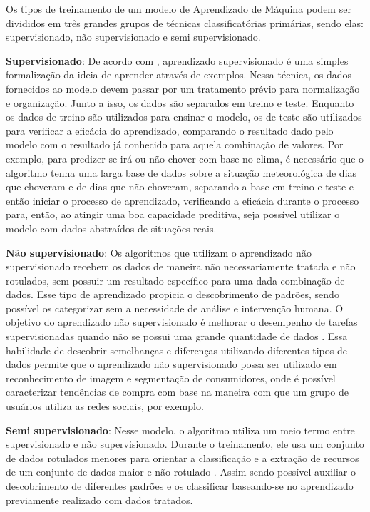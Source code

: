 Os tipos de treinamento de um modelo de Aprendizado de Máquina podem
ser divididos em três grandes grupos de técnicas classificatórias
primárias, sendo elas: supervisionado, não supervisionado e semi
supervisionado.

\textbf{Supervisionado}: De acordo com , aprendizado
supervisionado é uma simples formalização da ideia de aprender através
de exemplos. Nessa técnica, os dados fornecidos ao modelo devem passar
por um tratamento prévio para normalização e organização. Junto a
isso, os dados são separados em treino e teste. Enquanto os dados de treino
são utilizados para ensinar o modelo, os de teste são utilizados para
verificar a eficácia do aprendizado, comparando o resultado dado pelo
modelo com o resultado já conhecido para aquela combinação de
valores. Por exemplo, para predizer se irá ou não chover com base no
clima, é necessário que o algoritmo tenha uma larga base de dados
sobre a situação meteorológica de dias que choveram e de dias que não
choveram, separando a base em treino e teste e então iniciar o
processo de aprendizado, verificando a eficácia durante o processo
para, então, ao atingir uma boa capacidade preditiva, seja possível
utilizar o modelo com dados abstraídos de situações reais.

\textbf{Não supervisionado}: Os algoritmos que utilizam o aprendizado não
supervisionado recebem os dados de maneira não necessariamente
tratada e não rotulados, sem possuir um resultado específico para uma
dada combinação de dados. Esse tipo de aprendizado propicia o
descobrimento de padrões, sendo possível os categorizar sem a
necessidade de análise e intervenção humana. O objetivo do aprendizado
não supervisionado é melhorar o desempenho de tarefas supervisionadas
quando não se possui uma grande quantidade de dados
\cite{sutskever2015}. Essa habilidade de descobrir semelhanças e
diferenças utilizando diferentes tipos de dados permite que o
aprendizado não supervisionado possa ser utilizado em reconhecimento
de imagem e segmentação de consumidores, onde é possível caracterizar
tendências de compra com base na maneira com que um grupo de usuários
utiliza as redes sociais, por exemplo.

\textbf{Semi supervisionado}: Nesse modelo, o algoritmo utiliza um meio termo
entre supervisionado e não supervisionado. Durante o treinamento, ele
usa um conjunto de dados rotulados menores para orientar a
classificação e a extração de recursos de um conjunto de dados maior e
não rotulado \cite{uibm2022}. Assim sendo possível auxiliar o
descobrimento de diferentes padrões e os classificar baseando-se no
aprendizado previamente realizado com dados tratados.

